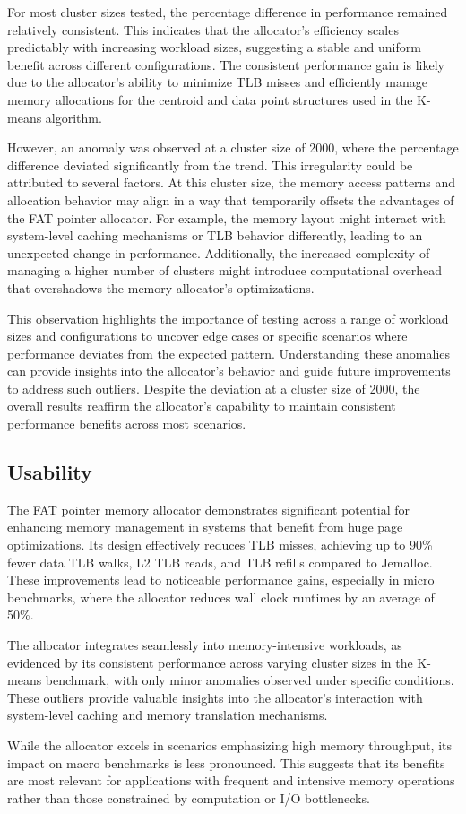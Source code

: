 \documentclass[11pt]{article}
\begin{document}
For most cluster sizes tested, the percentage difference in performance remained relatively 
consistent. This indicates that the allocator's efficiency scales predictably with increasing 
workload sizes, suggesting a stable and uniform benefit across different configurations. The 
consistent performance gain is likely due to the allocator's ability to minimize TLB misses 
and efficiently manage memory allocations for the centroid and data point structures used in 
the K-means algorithm.

However, an anomaly was observed at a cluster size of 2000, where the percentage difference 
deviated significantly from the trend. This irregularity could be attributed to several factors. 
At this cluster size, the memory access patterns and allocation behavior may align in a way that 
temporarily offsets the advantages of the FAT pointer allocator. For example, the memory layout 
might interact with system-level caching mechanisms or TLB behavior differently, leading to an 
unexpected change in performance. Additionally, the increased complexity of managing a higher 
number of clusters might introduce computational overhead that overshadows the memory allocator's 
optimizations.

This observation highlights the importance of testing across a range of workload sizes and 
configurations to uncover edge cases or specific scenarios where performance deviates from the 
expected pattern. Understanding these anomalies can provide insights into the allocator's 
behavior and guide future improvements to address such outliers. Despite the deviation at a 
cluster size of 2000, the overall results reaffirm the allocator's capability to maintain 
consistent performance benefits across most scenarios.
\subsection{Usability}
\label{sec:orgb4de289}
The FAT pointer memory allocator demonstrates significant potential for enhancing 
memory management in systems that benefit from huge page optimizations. Its design 
effectively reduces TLB misses, achieving up to 90\% fewer data TLB walks, L2 TLB reads, 
and TLB refills compared to Jemalloc. These improvements lead to noticeable performance 
gains, especially in micro benchmarks, where the allocator reduces wall clock runtimes 
by an average of 50\%.

The allocator integrates seamlessly into memory-intensive workloads, as evidenced by its 
consistent performance across varying cluster sizes in the K-means benchmark, with only 
minor anomalies observed under specific conditions. These outliers provide valuable 
insights into the allocator's interaction with system-level caching and memory translation mechanisms.

While the allocator excels in scenarios emphasizing high memory throughput, its impact on 
macro benchmarks is less pronounced. This suggests that its benefits are most relevant for 
applications with frequent and intensive memory operations rather than those constrained by 
computation or I/O bottlenecks.
\end{document}
